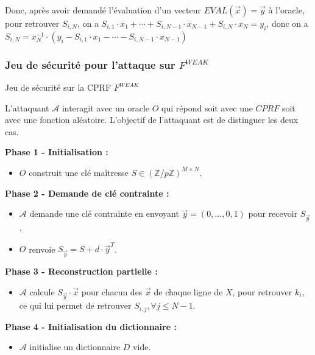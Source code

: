 \documentclass[9pt]{extarticle}
\begin{document}
Donc, après avoir demandé l'évaluation d'un vecteur $EVAL(\vec{x}) = \vec{y}$ à l'oracle, pour retrouver $S_{i,N}$, on a $S_{i,1} \cdot x_1 + \cdots + S_{i,N-1} \cdot x_{N-1} + S_{i,N} \cdot x_N = y_i$, donc on a $S_{i,N} = x_N^{-1} \cdot (y_i - S_{i,1} \cdot x_1 - \cdots - S_{i,N-1} \cdot x_{N-1})$

\subsubsection{Jeu de sécurité pour l'attaque sur $F^{WEAK}$}

\begin{defbox}{Jeu de sécurité sur la CPRF $F^{WEAK}$}

  L'attaquant $\mathcal{A}$ interagit avec un oracle $O$ qui répond soit avec une $CPRF$ soit avec une fonction aléatoire. 
  L’objectif de l'attaquant est de distinguer les deux cas.

  \medskip

  \textbf{Phase 1 - Initialisation :}
  \begin{itemize}
  \item $O$ construit une clé maîtresse $S \in (\mathbb{Z}/p\mathbb{Z})^{M \times N}$.
  \end{itemize}

  \medskip

  \textbf{Phase 2 - Demande de clé contrainte :}
  \begin{itemize}
  \item $\mathcal{A}$ demande une clé contrainte en envoyant $\vec{y} = (0,\ldots,0,1)$ pour recevoir $S_{\vec{y}}$.
  \item $O$ renvoie $S_{\vec{y}} = S + d \cdot \vec{y}^T$.
  \end{itemize}

  \medskip

  \textbf{Phase 3 - Reconstruction partielle :}
  \begin{itemize}
  \item $\mathcal{A}$ calcule $S_{\vec{y}} \cdot \vec{x}$ pour chacun des $\vec{x}$ de chaque ligne de $X$, pour retrouver $k_i$, ce qui lui permet de retrouver $S_{i,j}, \forall j \leq N-1$.
  \end{itemize}

  \medskip

  \textbf{Phase 4 - Initialisation du dictionnaire :}
  \begin{itemize}
  \item $\mathcal{A}$ initialise un dictionnaire $D$ vide.
  \end{itemize}


\end{defbox}
\end{document}
